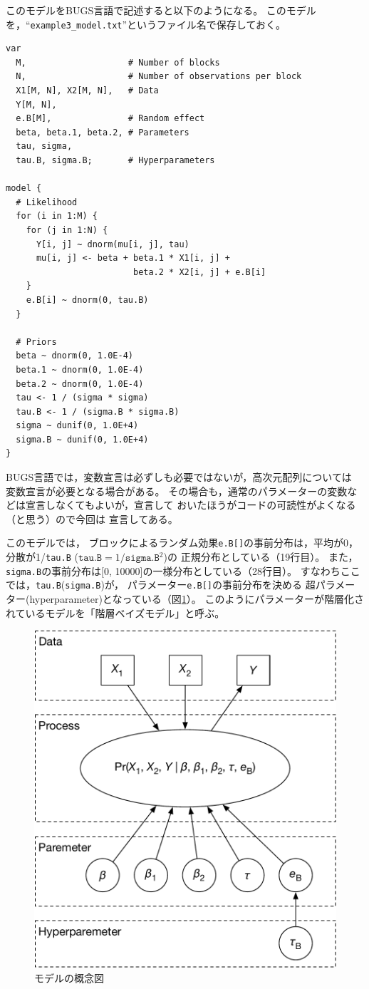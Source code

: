 \documentclass[11pt,uplatex]{jsarticle}
\begin{document}
このモデルをBUGS言語で記述すると以下のようになる。
このモデルを，``\texttt{example3\_model.txt}''というファイル名で保存しておく。

\begin{lstlisting}
var
  M,                    # Number of blocks
  N,                    # Number of observations per block
  X1[M, N], X2[M, N],   # Data
  Y[M, N],
  e.B[M],               # Random effect
  beta, beta.1, beta.2, # Parameters
  tau, sigma, 
  tau.B, sigma.B;       # Hyperparameters

model {
  # Likelihood
  for (i in 1:M) {
    for (j in 1:N) {
      Y[i, j] ~ dnorm(mu[i, j], tau)
      mu[i, j] <- beta + beta.1 * X1[i, j] +
                         beta.2 * X2[i, j] + e.B[i]
    }
    e.B[i] ~ dnorm(0, tau.B)
  }

  # Priors
  beta ~ dnorm(0, 1.0E-4)
  beta.1 ~ dnorm(0, 1.0E-4)
  beta.2 ~ dnorm(0, 1.0E-4)
  tau <- 1 / (sigma * sigma)
  tau.B <- 1 / (sigma.B * sigma.B)
  sigma ~ dunif(0, 1.0E+4)
  sigma.B ~ dunif(0, 1.0E+4)
}
\end{lstlisting}

BUGS言語では，変数宣言は必ずしも必要ではないが，高次元配列については
変数宣言が必要となる場合がある。
その場合も，通常のパラメーターの変数などは宣言しなくてもよいが，宣言して
おいたほうがコードの可読性がよくなる（と思う）ので今回は
宣言してある。

このモデルでは，
ブロックによるランダム効果\texttt{e.B[]}の事前分布は，平均が0，分散が1/\texttt{tau.B}
($\texttt{tau.B}=1/\texttt{sigma.B}^{2}$)の
正規分布としている（19行目）。
また，\texttt{sigma.B}の事前分布は[0, 10000]の一様分布としている（28行目）。
すなわちここでは，\texttt{tau.B}(\texttt{sigma.B})が，
パラメーター\texttt{e.B[]}の事前分布を決める
超パラメーター(hyperparameter)となっている（図\ref{example3_schema}）。
このようにパラメーターが階層化されているモデルを「階層ベイズモデル」と呼ぶ。

\begin{figure}[htbp]
	\begin{center}
		\includegraphics[bb=0 0 440 384, clip, width=280 bp]{example3_schema.pdf}
	\end{center}
	\caption{モデルの概念図}
	\label{example3_schema}
\end{figure}
\end{document}

